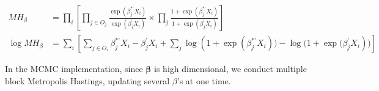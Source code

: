 \documentclass[12pt]{article}
\begin{document}
\begin{align}
MH_\beta &= \prod_i \left[ \prod\limits_{j \in O_j}\frac{ \exp(\beta_j^{*\prime}X_i)}{ \exp(\beta_j^{\prime}X_i)} \times \prod\limits_{j}\frac{1 + \exp(\beta_j^{*\prime}X_i)}{1 + \exp(\beta_j^{\prime}X_i)} \right] \\
\log MH_\beta &= \sum_i \left[ \sum_{j \in O_i} \beta_j^{*\prime}X_i - \beta_j^{\prime}X_i + \sum_{j} \log(1 + {\exp({\beta_j^{*\prime}X_i})) - \log(1 +  \exp(\beta_j^{\prime}X_i})) \right]
\end{align}

In the MCMC implementation, since $\bm{\beta}$ is high dimensional, we conduct multiple block Metropolis Hastings, updating several $\beta$'s at one time.

\clearpage


\end{document}
